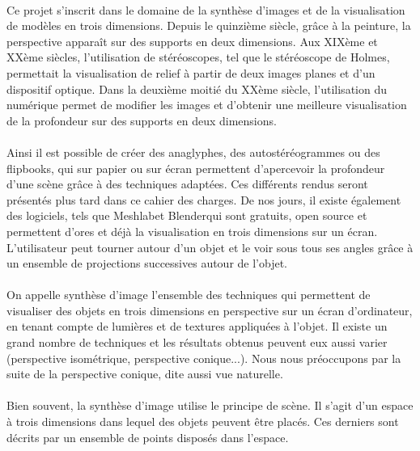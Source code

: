 \paragraph{}
	Ce projet s’inscrit dans le domaine de la synthèse d’images et de la visualisation de modèles en trois dimensions. Depuis le quinzième siècle, grâce à la peinture, la perspective apparaît sur des supports en deux dimensions\cite{wiki3D}. Aux XIXème et XXème siècles, l’utilisation de stéréoscopes\cite{stereoscope}, tel que le stéréoscope de Holmes, permettait la visualisation de relief à partir de deux images planes et d’un dispositif optique. Dans la deuxième moitié du XXème siècle, l’utilisation du numérique permet de modifier les images et d’obtenir une meilleure visualisation de la profondeur sur des supports en deux dimensions. 

\paragraph{}	
	Ainsi il est possible de créer des anaglyphes, des autostéréogrammes ou des flipbooks, qui sur papier ou sur écran permettent d’apercevoir la profondeur d’une scène grâce à des techniques adaptées. Ces différents rendus seront présentés plus tard dans ce cahier des charges. De nos jours, il existe également des logiciels, tels que Meshlab\footnotemark {}et Blender\footnotemark qui sont gratuits, open source et permettent d’ores et déjà la visualisation en trois dimensions sur un écran. L’utilisateur peut tourner autour d’un objet et le voir sous tous ses angles grâce à un ensemble de projections successives autour de l’objet.



\paragraph{}
	On appelle synthèse d’image l'ensemble des techniques qui permettent de visualiser des objets en trois dimensions en perspective sur un écran d'ordinateur, en tenant compte de lumières et de textures appliquées à l'objet. Il existe un grand nombre de techniques et les résultats obtenus peuvent eux aussi varier (perspective isométrique, perspective conique...). Nous nous préoccupons par la suite de la perspective conique, dite aussi vue naturelle. 

\paragraph{}
	Bien souvent, la synthèse d'image utilise le principe de scène. Il s'agit d'un espace à trois dimensions dans lequel des objets peuvent être placés. Ces derniers sont décrits par un ensemble de points disposés dans l'espace.

